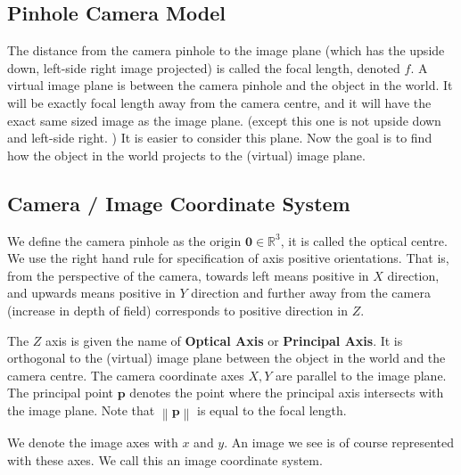 \documentclass[11pt]{article}
\newcommand{\bp}{\mathbf{p}}
\newcommand{\bzero}{\mathbf{0}}
\newcommand{\real}{\mathbb{R}}
\newcommand{\norm}[1]{\left\lVert#1\right\rVert}
\begin{document}
\subsection{Pinhole Camera Model}
The distance from the camera pinhole to the image plane (which has the upside down, left-side right image projected) is called the focal length, denoted $f$. A virtual image plane is between the camera pinhole and the object in the world. It will be exactly focal length away from the camera centre, and it will have the exact same sized image as the image plane. (except this one is not upside down and left-side right. ) It is easier to consider this plane. Now the goal is to find how the object in the world projects to the (virtual) image plane. 

\subsection{Camera / Image Coordinate System}
We define the camera pinhole as the origin $\bzero \in \real^3$, it is called the optical centre. We use the right hand rule for specification of axis positive orientations. That is, from the perspective of the camera, towards left means positive in $X$ direction, and upwards means positive in $Y$ direction and further away from the camera (increase in depth of field) corresponds to positive direction in $Z$. 

The $Z$ axis is given the name of \textbf{Optical Axis} or \textbf{Principal Axis}. It is orthogonal to the (virtual) image plane between the object in the world and the camera centre. The camera coordinate axes $X, Y$ are parallel to the image plane. The principal point $\bp$ denotes the point where the principal axis intersects with the image plane. Note that $\norm{\bp}$ is equal to the focal length. 

We denote the image axes with $x$ and $y$. An image we see is of course represented with these axes. We call this an image coordinate system. 
\end{document}
